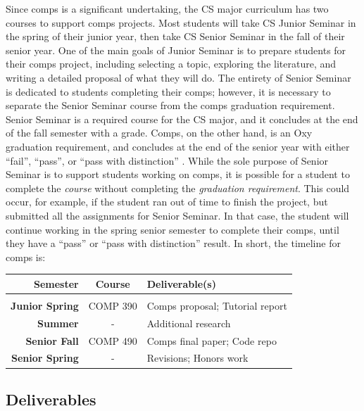 \documentclass[10pt,twocolumn]{article}
\begin{document}
Since comps is a significant undertaking, the CS major curriculum has two courses to support comps projects.
Most students will take CS Junior Seminar in the spring of their junior year, then take CS Senior Seminar in the fall of their senior year.
One of the main goals of Junior Seminar is to prepare students for their comps project, including selecting a topic, exploring the literature, and writing a detailed proposal of what they will do.
The entirety of Senior Seminar is dedicated to students completing their comps; however, it is necessary to separate the Senior Seminar course from the comps graduation requirement.
Senior Seminar is a required course for the CS major, and it concludes at the end of the fall semester with a grade.
Comps, on the other hand, is an Oxy graduation requirement, and concludes at the end of the senior year with either ``fail'', ``pass'', or ``pass with distinction'' \cite{OccidentalComps}.
While the sole purpose of Senior Seminar is to support students working on comps, it is possible for a student to complete the \textit{course} without completing the \textit{graduation requirement}.
This could occur, for example, if the student ran out of time to finish the project, but submitted all the assignments for Senior Seminar.
In that case, the student will continue working in the spring senior semester to complete their comps, until they have a ``pass'' or ``pass with distinction'' result.
In short, the timeline for comps is:

\vspace{\baselineskip}
{\footnotesize
\begin{tabular}{r|cl}
    \textbf{Semester}       &  \textbf{Course}  &  \textbf{Deliverable(s)}          \\
    \hline \\
    \textbf{Junior Spring}  &  COMP 390         &  Comps proposal; Tutorial report  \\
    \textbf{Summer}         &  -                &  Additional research              \\
    \textbf{Senior Fall}    &  COMP 490         &  Comps final paper; Code repo     \\
    \textbf{Senior Spring}  &  -                &  Revisions; Honors work           \\
\end{tabular}
}
\vspace{\baselineskip}

\subsection{Deliverables}
\end{document}
